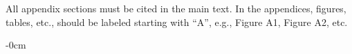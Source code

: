 \documentclass[journal,article,submit,moreauthors,technologies]{Definitions/mdpi}
\begin{document}
\appendixstart
\appendix
\section[\appendixname~\thesection]{}

All appendix sections must be cited in the main text. In the appendices, figures, tables, etc., should be labeled starting with ``A'', e.g., Figure A1, Figure A2, etc.

\begin{adjustwidth}{-\extralength}{0cm}





\PublishersNote{}
\end{adjustwidth}
\end{document}
